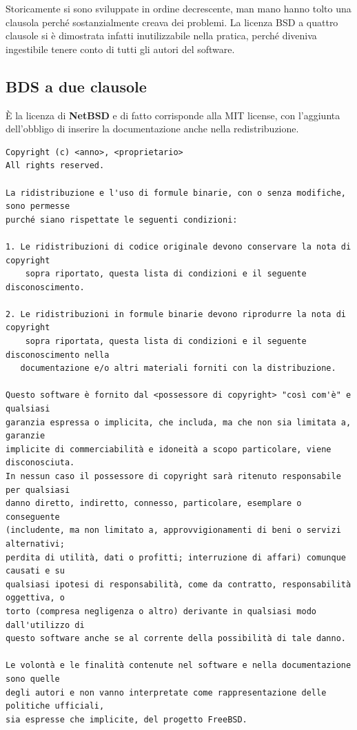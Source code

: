 \noindent Storicamente si sono sviluppate in ordine decrescente, man mano hanno tolto una clausola perché sostanzialmente creava dei problemi. La licenza BSD a quattro clausole si è dimostrata infatti inutilizzabile nella pratica, perché diveniva ingestibile tenere conto di tutti gli autori del software. 

\subsection{BDS a due clausole}

È la licenza di \textbf{NetBSD} e di fatto corrisponde alla MIT license, con l'aggiunta dell'obbligo di inserire la documentazione anche nella redistribuzione.

\begin{lstlisting}[caption=BSD a due clausole (NetBDS)]
Copyright (c) <anno>, <proprietario>
All rights reserved.

La ridistribuzione e l'uso di formule binarie, con o senza modifiche, sono permesse
purché siano rispettate le seguenti condizioni:

1. Le ridistribuzioni di codice originale devono conservare la nota di copyright 
    sopra riportato, questa lista di condizioni e il seguente disconoscimento.

2. Le ridistribuzioni in formule binarie devono riprodurre la nota di copyright 
    sopra riportata, questa lista di condizioni e il seguente disconoscimento nella
   documentazione e/o altri materiali forniti con la distribuzione.

Questo software è fornito dal <possessore di copyright> "così com'è" e qualsiasi
garanzia espressa o implicita, che includa, ma che non sia limitata a, garanzie 
implicite di commerciabilità e idoneità a scopo particolare, viene disconosciuta. 
In nessun caso il possessore di copyright sarà ritenuto responsabile per qualsiasi 
danno diretto, indiretto, connesso, particolare, esemplare o conseguente 
(includente, ma non limitato a, approvvigionamenti di beni o servizi alternativi;
perdita di utilità, dati o profitti; interruzione di affari) comunque causati e su 
qualsiasi ipotesi di responsabilità, come da contratto, responsabilità oggettiva, o 
torto (compresa negligenza o altro) derivante in qualsiasi modo dall'utilizzo di 
questo software anche se al corrente della possibilità di tale danno.

Le volontà e le finalità contenute nel software e nella documentazione sono quelle
degli autori e non vanno interpretate come rappresentazione delle politiche ufficiali,
sia espresse che implicite, del progetto FreeBSD.
\end{lstlisting}

